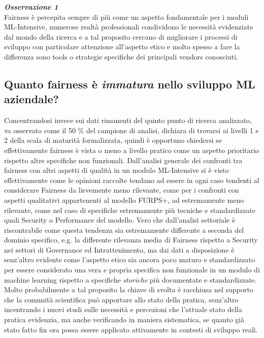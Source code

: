     \begin{center}
	
        \begin{tcolorbox}[width=\textwidth, colframe=black, colback=Gray]
    			\begin{minipage}{\textwidth}
    				\textit{\faSearch  \textbf{ Osservazione 1}}\\
    		     Fairness è percepita sempre di più come un aspetto fondamentale per i moduli ML-Intensive, numerose realtà professionali condividono le necessità evidenziate dal mondo della ricerca e a tal proposito cercano di migliorare i processi di sviluppo con particolare attenzione all'aspetto etico e molto spesso a fare la differenza sono tools o strategie specifiche dei principali vendors conosciuti.
    			\end{minipage}
		\end{tcolorbox}
	\end{center}
    
   \subsection{Quanto fairness è \emph{immatura} nello sviluppo ML aziendale?}
   Concentrandosi invece sui dati rimanenti del quinto punto di ricerca analizzato, va osservato come il 50 \% del campione di analisi, dichiara di trovarsi ai livelli 1 e 2 della scala di maturità formalizzata, quindi è opportuno chiedersi se effettivamente fairness è vista o meno a livello pratico come un aspetto prioritario rispetto altre specifiche non funzionali. Dall'analisi generale dei confronti tra fairness con altri aspetti di qualità in un modulo ML-Intensive si è visto effettivamente come le opinioni raccolte tendano ad essere in ogni caso tendenti al considerare Fairness da lievemente meno rilevante, come per i confronti con aspetti qualitativi appartenenti al modello FURPS+, ad estremamente meno rilevante, come nel caso di specifiche estremamente più tecniche e standardizzate quali Security o Performance del modello. Vero che dall'analisi settoriale è riscontrabile come questa tendenza sia estremamente differente a seconda del dominio specifico, e.g. la differente rilevanza media di Fairness rispetto a Security nei settori di Governance ed Intrattenimento, ma dai dati a disposizione è senz'altro evidente come l'aspetto etico sia ancora poco maturo e standardizzato per essere considerato una vera e propria specifica non funzionale in un modulo di machine learning rispetto a specifiche \emph{storiche} più documentate e standardizzate. Molto probabilmente a tal proposito la chiave di svolta è racchiusa nel supporto che la comunità scientifica può apportare allo stato della pratica, senz'altro incentrando i nuovi studi sulle necessità e percezioni che l'attuale stato della pratica evidenzia, ma anche verificando in maniera sistematica, se quanto già stato fatto fin ora possa essere applicato attivamente in contesti di sviluppo reali.
   
